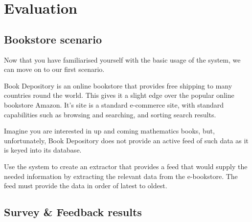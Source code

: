 \documentclass[urop]{socreport}
\begin{document}
\listoffigures 
\listoftables
\tableofcontents 











\newpage
\appendix
\chapter{Evaluation}
\section{Bookstore scenario}

Now that you have familiarised yourself with the basic usage of the system,
we can move on to our first scenario.

Book Depository is an online bookstore that provides free shipping to many
countries round the world. This gives it a slight edge over the popular
online bookstore Amazon. It's site is a standard e-commerce site, with standard
capabilities such as browsing and searching, and sorting search results.

Imagine you are interested in up and coming mathematics books, but,
unfortunately, Book Depository does not provide an active feed of
such data as it is keyed into its database.

Use the system to create an extractor that provides a feed that would
supply the needed information by extracting the relevant data from the
e-bookstore. The feed must provide the data in order of latest to oldest.
\newpage
\section{Survey \& Feedback results}

\end{document}
